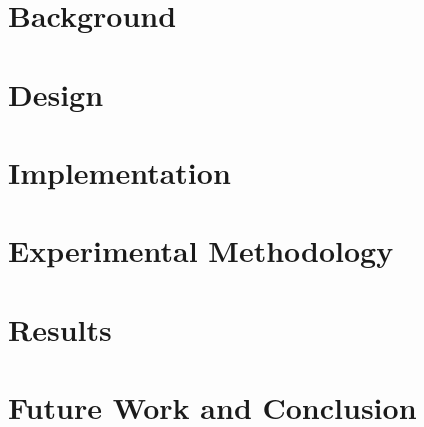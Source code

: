 \documentclass{report}
\begin{document}
\begin{singlespacing}



\tableofcontents

\newpage

\chapter{Background}
\label{chapter:background}


\chapter{Design}
\label{chapter:design}


\chapter{Implementation}
\label{chapter:implementation}


\chapter{Experimental Methodology}
\label{chapter:experimental_methodology}


\chapter{Results}
\label{chapter:results}


\chapter{Future Work and Conclusion}
\label{chapter:future_work_and_conclusion}


\newpage

% 

 



\end{singlespacing}
\end{document}
